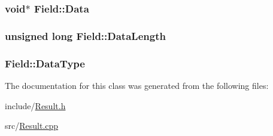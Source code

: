 \subsubsection[{Data}]{\setlength{\rightskip}{0pt plus 5cm}void$\ast$ Field\+::\+Data\hspace{0.3cm}{\ttfamily [protected]}}\label{class_field_ae62c758ab217b45f212c11e972456c12}
\hypertarget{class_field_ab26af1e23e7541bb670cbef08b29b9b4}{}
\subsubsection[{Data\+Length}]{\setlength{\rightskip}{0pt plus 5cm}unsigned long Field\+::\+Data\+Length\hspace{0.3cm}{\ttfamily [protected]}}\label{class_field_ab26af1e23e7541bb670cbef08b29b9b4}
\hypertarget{class_field_ae4f24cedb1919b2f045c738706a55d22}{}
\subsubsection[{Data\+Type}]{ Field\+::\+Data\+Type\hspace{0.3cm}{\ttfamily [protected]}}\label{class_field_ae4f24cedb1919b2f045c738706a55d22}


The documentation for this class was generated from the following files\+:\begin{DoxyCompactItemize}
\item 
include/\hyperlink{_result_8h}{Result.\+h}\item 
src/\hyperlink{_result_8cpp}{Result.\+cpp}\end{DoxyCompactItemize}
